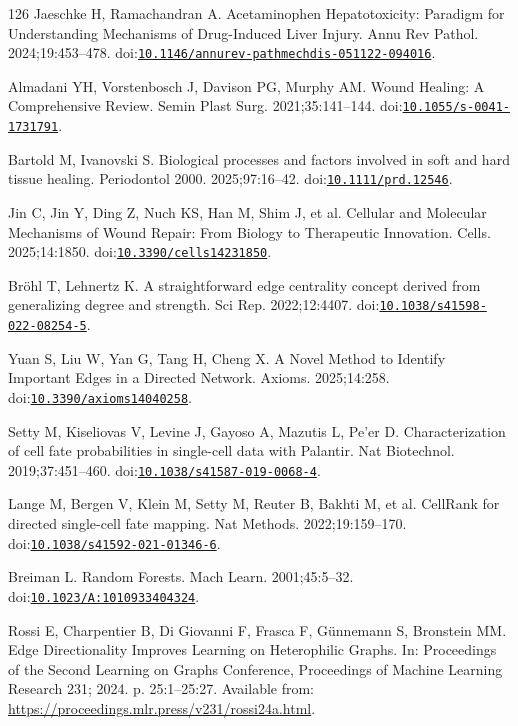 \begin{thebibliography}{126}
Jaeschke H, Ramachandran A. Acetaminophen Hepatotoxicity: Paradigm for Understanding Mechanisms of Drug-Induced Liver Injury. Annu Rev Pathol. 2024;19:453--478. doi:\href{https://doi.org/10.1146/annurev-pathmechdis-051122-094016}{\nolinkurl{10.1146/annurev-pathmechdis-051122-094016}}.

Almadani YH, Vorstenbosch J, Davison PG, Murphy AM. Wound Healing: A Comprehensive Review. Semin Plast Surg. 2021;35:141--144. doi:\href{https://doi.org/10.1055/s-0041-1731791}{\nolinkurl{10.1055/s-0041-1731791}}.

Bartold M, Ivanovski S. Biological processes and factors involved in soft and hard tissue healing. Periodontol 2000. 2025;97:16--42. doi:\href{https://doi.org/10.1111/prd.12546}{\nolinkurl{10.1111/prd.12546}}.

Jin C, Jin Y, Ding Z, Nuch KS, Han M, Shim J, et al. Cellular and Molecular Mechanisms of Wound Repair: From Biology to Therapeutic Innovation. Cells. 2025;14:1850. doi:\href{https://doi.org/10.3390/cells14231850}{\nolinkurl{10.3390/cells14231850}}.

Bröhl T, Lehnertz K. A straightforward edge centrality concept derived from generalizing degree and strength. Sci Rep. 2022;12:4407. doi:\href{https://doi.org/10.1038/s41598-022-08254-5}{\nolinkurl{10.1038/s41598-022-08254-5}}.

Yuan S, Liu W, Yan G, Tang H, Cheng X. A Novel Method to Identify Important Edges in a Directed Network. Axioms. 2025;14:258. doi:\href{https://doi.org/10.3390/axioms14040258}{\nolinkurl{10.3390/axioms14040258}}.

Setty M, Kiseliovas V, Levine J, Gayoso A, Mazutis L, Pe'er D. Characterization of cell fate probabilities in single-cell data with Palantir. Nat Biotechnol. 2019;37:451--460. doi:\href{https://doi.org/10.1038/s41587-019-0068-4}{\nolinkurl{10.1038/s41587-019-0068-4}}.

Lange M, Bergen V, Klein M, Setty M, Reuter B, Bakhti M, et al. CellRank for directed single-cell fate mapping. Nat Methods. 2022;19:159--170. doi:\href{https://doi.org/10.1038/s41592-021-01346-6}{\nolinkurl{10.1038/s41592-021-01346-6}}.

Breiman L. Random Forests. Mach Learn. 2001;45:5--32. doi:\href{https://doi.org/10.1023/A:1010933404324}{\nolinkurl{10.1023/A:1010933404324}}.

Rossi E, Charpentier B, Di Giovanni F, Frasca F, Günnemann S, Bronstein MM. Edge Directionality Improves Learning on Heterophilic Graphs. In: Proceedings of the Second Learning on Graphs Conference, Proceedings of Machine Learning Research 231; 2024. p. 25:1--25:27. Available from: \url{https://proceedings.mlr.press/v231/rossi24a.html}.


\end{thebibliography}
